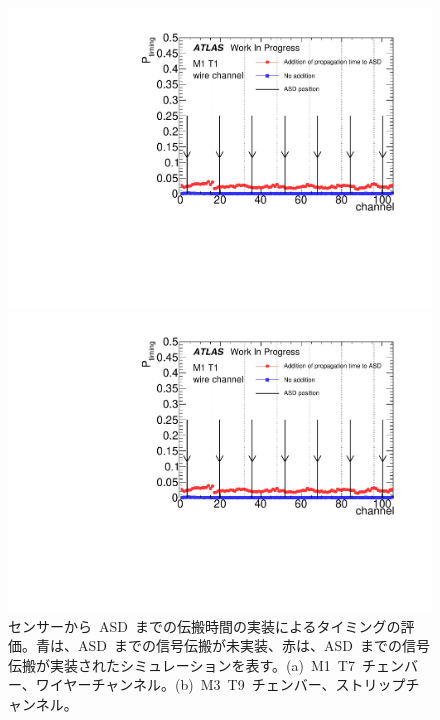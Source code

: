 \begin{figure}[H]
    \begin{minipage}{0.49\hsize}
    \centering   
    \includegraphics[width=\textwidth,page=8]{img/plot/ASD.pdf}
    \subcaption{}
    \end{minipage}
    \begin{minipage}{0.49\hsize}
    \centering   
    \includegraphics[width=\textwidth,page=35]{img/plot/ASD.pdf}
    \subcaption{}
    \end{minipage}
    \caption[センサーから~ASD~までの伝搬時間の実装によるタイミングの評価]{センサーから~ASD~までの伝搬時間の実装によるタイミングの評価。青は、ASD~までの信号伝搬が未実装、赤は、ASD~までの信号伝搬が実装されたシミュレーションを表す。(a)~M1~T7~チェンバー、ワイヤーチャンネル。(b)~M3~T9~チェンバー、ストリップチャンネル。}
    \label{fig:asd}
\end{figure}

